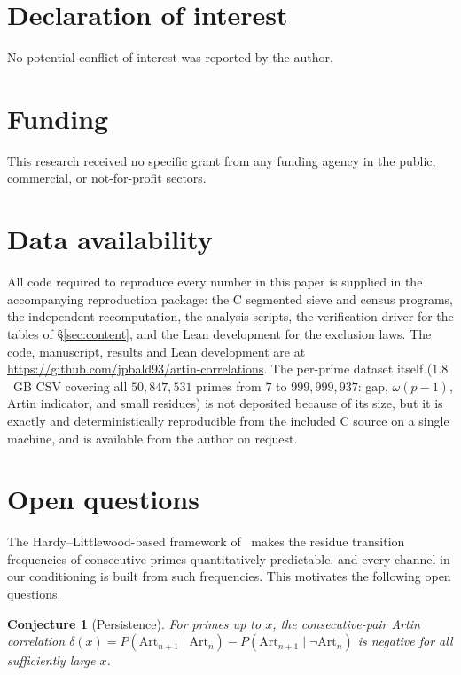 \documentclass[11pt,reqno]{amsart}
\theoremstyle{plain}
\newtheorem{conjecture}[theorem]{Conjecture}
\theoremstyle{definition}
\newcommand{\Art}{\mathrm{Art}}
\begin{document}
\section*{Declaration of interest}
No potential conflict of interest was reported by the author.

\section*{Funding}
This research received no specific grant from any funding agency in the public, commercial,
or not-for-profit sectors.

\section*{Data availability}
All code required to reproduce every number in this paper is supplied in the accompanying
reproduction package: the C segmented sieve and census programs, the independent
recomputation, the analysis scripts, the verification driver for the tables of
\S\ref{sec:content}, and the Lean development for the exclusion laws. The code, manuscript,
results and Lean development are at
\url{https://github.com/jpbald93/artin-correlations}. The per-prime dataset itself
($1.8$~GB CSV covering all $50{,}847{,}531$ primes from $7$ to $999{,}999{,}937$: gap,
$\omega(p-1)$, Artin indicator, and small residues) is not deposited because of its size,
but it is exactly and deterministically reproducible from the included C source on a single
machine, and is available from the author on request.



\section{Open questions}
\label{sec:questions}

The Hardy--Littlewood-based framework of~\cite{LOS2016} makes the residue
transition frequencies of consecutive primes quantitatively predictable, and
every channel in our conditioning is built from such frequencies. This
motivates the following open questions.

\begin{conjecture}[Persistence]
	\label{conj:persist}
	For primes up to $x$, the consecutive-pair Artin correlation
	$\delta(x) = P(\Art_{n+1} \mid \Art_n) - P(\Art_{n+1} \mid \lnot\Art_n)$
	is negative for all sufficiently large $x$.
\end{conjecture}
\end{document}
